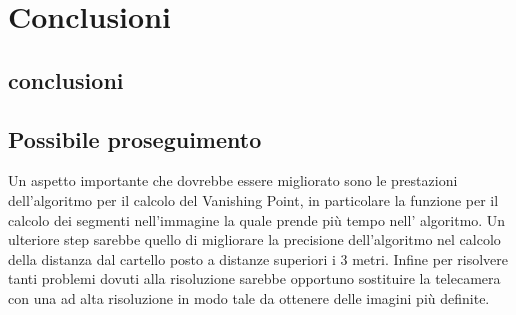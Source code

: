 
\chapter{Conclusioni}

	\section{conclusioni}
	
	\section{Possibile proseguimento}

		Un aspetto importante che dovrebbe essere migliorato sono le prestazioni dell'algoritmo per il calcolo del Vanishing Point, in particolare la funzione per il calcolo dei segmenti nell'immagine la quale prende più tempo nell' algoritmo. Un ulteriore step sarebbe quello di migliorare la precisione dell'algoritmo nel calcolo della distanza dal cartello posto a distanze superiori i 3 metri. Infine per risolvere tanti problemi dovuti alla risoluzione sarebbe opportuno sostituire la telecamera con una ad alta risoluzione in modo tale da ottenere delle imagini più definite.

		